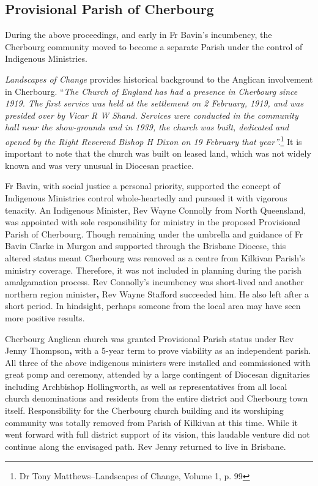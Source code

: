 \subsection{Provisional Parish of Cherbourg}



During the above proceedings, and early in Fr Bavin's incumbency, the Cherbourg community moved to become a separate Parish under the control of Indigenous Ministries.



\emph{Landscapes of Change} provides historical background to the Anglican involvement in Cherbourg. ``\emph{The Church of England has had a presence in Cherbourg since 1919. The first service was held at the settlement on 2 February, 1919, and was presided over by Vicar R W Shand. Services were conducted in the community hall near the show-grounds and in 1939, the church was built, dedicated and opened by the Right Reverend Bishop H Dixon on 19 February that year''.}\footnote{Dr Tony Matthews--Landscapes of Change, Volume 1, p. 99} It is important to note that the church was built on leased land, which was not widely known and was very unusual in Diocesan practice.


Fr Bavin, with social justice a personal priority, supported the concept of Indigenous Ministries control whole-heartedly and pursued it with vigorous tenacity. An Indigenous Minister, Rev Wayne Connolly from North Queensland, was appointed with sole responsibility for ministry in the proposed Provisional Parish of Cherbourg. Though remaining under the umbrella and guidance of Fr Bavin Clarke in Murgon and supported through the Brisbane Diocese, this altered status meant Cherbourg was removed as a centre from Kilkivan Parish's ministry coverage. Therefore, it was not included in planning during the parish amalgamation process. Rev Connolly's incumbency was short-lived and another northern region minister\textbf{,} Rev Wayne Stafford succeeded him. He also left after a short period. In hindsight, perhaps someone from the local area may have seen more positive results.



Cherbourg Anglican church was granted Provisional Parish status under Rev Jenny Thompson\textbf{,} with a 5-year term to prove viability as an independent parish. All three of the above indigenous ministers were installed and commissioned with great pomp and ceremony, attended by a large contingent of Diocesan dignitaries including Archbishop Hollingworth, as well as representatives from all local church denominations and residents from the entire district and Cherbourg town itself. Responsibility for the Cherbourg church building and its worshiping community was totally removed from Parish of Kilkivan at this time. While it went forward with full district support of its vision, this laudable venture did not continue along the envisaged path. Rev Jenny returned to live in Brisbane.



